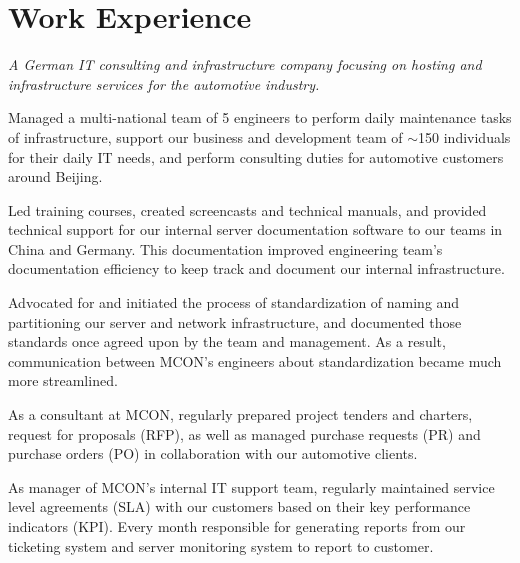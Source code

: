 \documentclass[a4paper]{deedy-resume-proximanova-sanfran} %
\begin{document}
\begin{minipage}[t]{0.66\textwidth} %


\section{Work Experience}


\emph{A German IT consulting and infrastructure company focusing on hosting and infrastructure services for the automotive industry.}
\vspace{\topsep} %
\begin{tightitemize}
\item Managed a multi-national team of 5 engineers to perform daily maintenance tasks of infrastructure, support our business and development team of $\mathtt{\sim}$150 individuals for their daily IT needs, and perform consulting duties for automotive customers around Beijing.
\item Led training courses, created screencasts and technical manuals, and provided technical support for our internal server documentation software to our teams in China and Germany. This documentation improved engineering team's documentation efficiency to keep track and document our internal infrastructure.
\item Advocated for and initiated the process of standardization of naming and partitioning our server and network infrastructure, and documented those standards once agreed upon by the team and management. As a result, communication between MCON's engineers about standardization became much more streamlined.
\item As a consultant at MCON, regularly prepared project tenders and charters, request for proposals (RFP), as well as managed purchase requests (PR) and purchase orders (PO) in collaboration with our automotive clients.
\item As manager of MCON's internal IT support team, regularly maintained service level agreements (SLA) with our customers based on their key performance indicators (KPI). Every month responsible for generating reports from our ticketing system and server monitoring system to report to customer.
\end{tightitemize}


\end{minipage}
\end{document}
